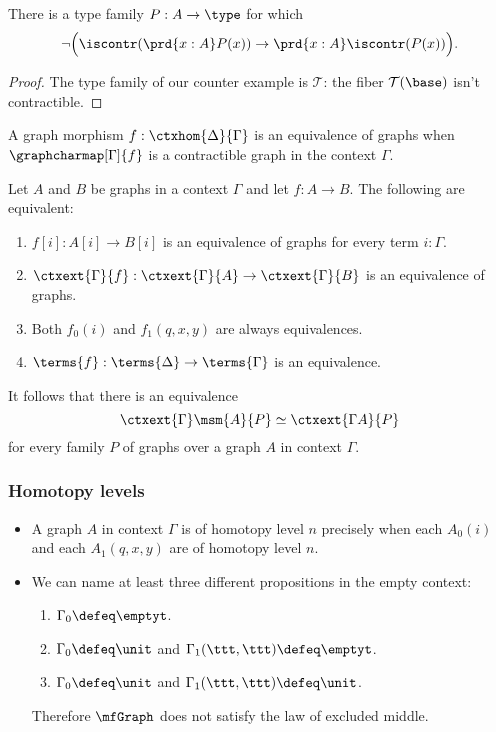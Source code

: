 \begin{thm}\label{thm:wfe-converse}
There is a type family $P:A\to\type$ for which
\begin{equation*}
\neg\Big(\iscontr(\prd{x:A}P(x))\to\prd{x:A}\iscontr(P(x))\Big).
\end{equation*}
\end{thm}

\begin{proof}
The type family of our counter example is $\mathcal{T}$: the fiber $\mathcal{T}(\base)$ isn't contractible.
\end{proof}

\begin{defn}
A graph morphism $f:\ctxhom{\Delta}{\Gamma}$ is an equivalence of graphs when
$\graphcharmap[\Gamma]{f}$ is a contractible graph in the context $\Gamma$.
\end{defn}

\begin{lem}
Let $A$ and $B$ be graphs in a context $\Gamma$ and let $f:A\to B$. The following are equivalent:
\begin{enumerate}
\item $f[i]:A[i]\to B[i]$ is an equivalence of graphs for every term $i:\Gamma$.
\item $\ctxext{\Gamma}{f}:\ctxext{\Gamma}{A}\to\ctxext{\Gamma}{B}$ is an equivalence of graphs.
\item Both $f_0(i)$ and $f_1(q,x,y)$ are always equivalences.
\item $\terms{f}:\terms{\Delta}\to\terms{\Gamma}$ is an equivalence.
\end{enumerate}
\end{lem}

\begin{rmk}
It follows that there is an equivalence
\begin{equation*}
\ctxext{\Gamma}\msm{A}{P}\simeq\ctxext{{\Gamma}{A}}{P}
\end{equation*}
for every family $P$ of graphs over a graph $A$ in context $\Gamma$.
\end{rmk}

\subsubsection{Homotopy levels}
\begin{itemize}
\item A graph $A$ in context $\Gamma$ is of homotopy level $n$ precisely when each
$A_0(i)$ and each $A_1(q,x,y)$ are of homotopy level $n$. 
\item We can name at least three different propositions in the empty context:
\begin{enumerate}
\item $\Gamma_0\defeq\emptyt$.
\item $\Gamma_0\defeq\unit$ and $\Gamma_1(\ttt,\ttt)\defeq\emptyt$.
\item $\Gamma_0\defeq\unit$ and $\Gamma_1(\ttt,\ttt)\defeq\unit$.
\end{enumerate}
Therefore $\mfGraph$ does not satisfy the law of excluded middle.
\end{itemize}



